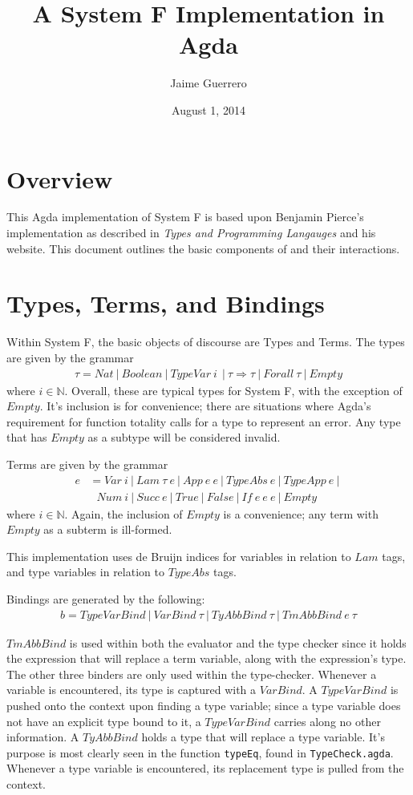 \documentclass{amsart}
\author{Jaime Guerrero}
\title{A System F Implementation in Agda}
\date{August 1, 2014}
\begin{document}
\maketitle

\section{Overview}
This Agda implementation of System F is based upon Benjamin Pierce's
implementation as described in \textit{Types and Programming Langauges} and
his website.  This document outlines the basic components of and their
interactions.

\section{Types, Terms, and Bindings}
Within System F, the basic objects of discourse are Types and Terms.  The
types are given by the grammar
\begin{align*}
\tau = Nat ~|~ Boolean ~|~ TypeVar ~i~ ~|~ \tau \Rightarrow \tau ~|~ Forall ~\tau ~|~ Empty
\end{align*}
where $i \in \mathbb{N}$.  Overall, these are typical types for System F, with
the exception of $Empty$.  It's inclusion is for convenience; there are
situations where Agda's requirement for function totality calls for a type to
represent an error.  Any type that has $Empty$ as a subtype will be considered
invalid.

Terms are given by the grammar
\begin{align*}
    e &= Var ~i ~|~ Lam~ \tau ~e ~|~ App ~e~ e~ |~ TypeAbs ~e ~|~ TypeApp ~e ~|~ \\
      & ~~~Num ~i ~|~ Succ ~e ~|~ True ~|~ False ~|~ If ~e ~e ~e ~|~ Empty
\end{align*}
where $i \in \mathbb{N}$. Again, the inclusion of $Empty$ is a convenience;
any term with $Empty$ as a subterm is ill-formed.

This implementation uses de Bruijn indices for variables in relation to $Lam$
tags, and type variables in relation to $TypeAbs$ tags.

Bindings are generated by the following:
\begin{align*}
    b = TypeVarBind ~|~ VarBind~ \tau ~|~ TyAbbBind~ \tau ~|~ TmAbbBind~ e~ \tau
\end{align*}

$TmAbbBind$ is used within both the evaluator and the type checker since it
holds the expression that will replace a term variable, along with the
expression's type.  The other three binders are only used within the
type-checker.  Whenever a variable is encountered, its type is captured with
a $VarBind$.  A $TypeVarBind$ is pushed onto the context upon finding a type
variable; since a type variable does not have an explicit type bound to it,
a $TypeVarBind$ carries along no other information.  A $TyAbbBind$ holds
a type that will replace a type variable.  It's purpose is most clearly seen
in the function \texttt{typeEq}, found in \texttt{TypeCheck.agda}.  Whenever
a type variable is encountered, its replacement type is pulled from the
context.
\end{document}
